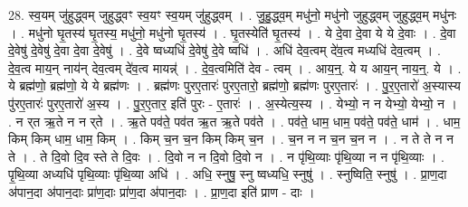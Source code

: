 \documentclass[17pt]{extarticle}
\begin{document}
28. स्व॒यम् जु॑हुद्ध्वम् जुहुद्ध्वꣳ स्व॒यꣳ स्व॒यम् जु॑हुद्ध्वम् । . जु॒हु॒द्ध्व॒म् मधु॑नो॒ मधु॑नो जुहुद्ध्वम् जुहुद्ध्व॒म् मधु॑नः । . मधु॑नो घृ॒तस्य॑ घृ॒तस्य॒ मधु॑नो॒ मधु॑नो घृ॒तस्य॑ । . घृ॒तस्येति॑ घृ॒तस्य॑ । . ये दे॒वा दे॒वा ये ये दे॒वाः । . दे॒वा दे॒वेषु॑ दे॒वेषु॑ दे॒वा दे॒वा दे॒वेषु॑ । . दे॒वे ष्वध्यधि॑ दे॒वेषु॑ दे॒वे ष्वधि॑ । . अधि॑ देव॒त्वम् दे॑व॒त्व मध्यधि॑ देव॒त्वम् । . दे॒व॒त्व माय॒न् नाय॑न् देव॒त्वम् दे॑व॒त्व मायन्न्॑ । . दे॒व॒त्वमिति॑ देव - त्वम् । . आय॒न्॒. ये य आय॒न् नाय॒न्॒. ये । . ये ब्रह्म॑णो॒ ब्रह्म॑णो॒ ये ये ब्रह्म॑णः । . ब्रह्म॑णः पुरए॒तारः॑ पुरए॒तारो॒ ब्रह्म॑णो॒ ब्रह्म॑णः पुरए॒तारः॑ । . पु॒र॒ए॒तारो॑ अ॒स्यास्य पु॑रए॒तारः॑ पुरए॒तारो॑ अ॒स्य । . पु॒र॒ए॒तार॒ इति॑ पुरः - ए॒तारः॑ । . अ॒स्येत्य॒स्य । . येभ्यो॒ न न येभ्यो॒ येभ्यो॒ न । . न र्‌त ऋ॒ते न न र्‌ते । . ऋ॒ते पव॑ते॒ पव॑त ऋ॒त ऋ॒ते पव॑ते । . पव॑ते॒ धाम॒ धाम॒ पव॑ते॒ पव॑ते॒ धाम॑ । . धाम॒ किम् किम् धाम॒ धाम॒ किम् । . किम् च॒न च॒न किम् किम् च॒न । . च॒न न न च॒न च॒न न । . न ते ते न न ते । . ते दि॒वो दि॒व स्ते ते दि॒वः । . दि॒वो न न दि॒वो दि॒वो न । . न पृ॑थि॒व्याः पृ॑थि॒व्या न न पृ॑थि॒व्याः । . पृ॒थि॒व्या अध्यधि॑ पृथि॒व्याः पृ॑थि॒व्या अधि॑ । . अधि॒ स्नुषु॒ स्नु ष्वध्यधि॒ स्नुषु॑ । . स्नुष्विति॒ स्नुषु॑ । . प्रा॒ण॒दा अ॑पान॒दा अ॑पान॒दाः प्रा॑ण॒दाः प्रा॑ण॒दा अ॑पान॒दाः । . प्रा॒ण॒दा इति॑ प्राण - दाः । \newline
\end{document}
